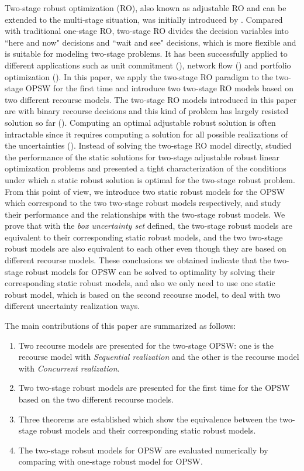 \documentclass[preprint,review,10pt,round,authoryear]{elsarticle}\usepackage[]{graphicx}\usepackage[]{color}
\theoremstyle{plain}
\theoremstyle{definition}
\theoremstyle{remark}
\begin{document}
Two-stage robust optimization (RO), also known as adjustable RO and can be extended to the multi-stage situation, was initially introduced by \cite{ben2004adjustable}. Compared with traditional one-stage RO, two-stage RO divides the decision variables into ``here and now" decisions and ``wait and see" decisions, which is more flexible and is suitable for modeling two-stage problems. It has been successfully applied to different applications such as unit commitment (\cite{an2015exploring,wang2016two}), network flow (\cite{atamturk2007two,ordonez2007robust}) and portfolio optimization (\cite{takeda2008adjustable}). In this paper, we apply the two-stage RO paradigm to the two-stage OPSW for the first time and introduce two two-stage RO models based on two different recourse models. The two-stage RO models introduced in this paper are with binary recourse decisions and this kind of problem has largely resisted solution so far (\cite{hanasusanto2015k}). Computing an optimal adjustable robust solution is often intractable since it requires computing a solution for all possible realizations of the uncertainties (\cite{feige2007robust}). Instead of solving the two-stage RO model directly, \cite{bertsimas2015tight} studied the performance of the static solutions for two-stage adjustable robust linear optimization problems and presented a tight characterization of the conditions under which a static robust solution is optimal for the two-stage robust problem. From this point of view, we introduce two static robust models for the OPSW which correspond to the two two-stage robust models respectively, and study their performance and the relationships with the two-stage robust models. We prove that with the \emph{box uncertainty set} defined, the two-stage robust models are equivalent to their corresponding static robust models, and the two two-stage robust models are also equivalent to each other even though they are based on different recourse models. These conclusions we obtained indicate that the two-stage robust models for OPSW can be solved to optimality by solving their corresponding static robust models, and also we only need to use one static robust model, which is based on the second recourse model, to deal with two different uncertainty realization ways. 


The main contributions of this paper are summarized as follows:
\begin{enumerate}
\item Two recourse models are presented for the two-stage OPSW: one is the recourse model with \emph{Sequential realization} and the other is the recourse model with \emph{Concurrent realization}.
\item Two two-stage robust models are presented for the first time for the OPSW based on the two different recourse models.
\item Three theorems are established which show the equivalence between the two-stage robust models and their corresponding static robust models.
\item The two-stage robsut models for OPSW are evaluated numerically by comparing with one-stage robust model for OPSW.
\end{enumerate}
\end{document}
